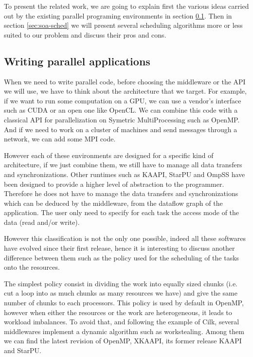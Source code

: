 \documentclass[10pt, conference, compsocconf]{IEEEtran}
\begin{document}
To present the related work, we are going to explain first the various ideas
carried out by the existing parallel programing environments in section
\ref{sec:soa-par-run}.  Then in section \ref{sec:soa-sched} we will
present several scheduling algorithms more or less suited to our problem and
discuss their pros and cons.

\subsection{Writing parallel applications} \label{sec:soa-par-run}

When we need to write parallel code, before choosing the middleware or the API
we will use, we have to think about the architecture that we target. For
example, if we want to run some computation on a GPU, we can use a vendor's
interface such as CUDA\cite{nvidia2010c} or an open one like
OpenCL\cite{stone2010opencl}. We can combine this code with a classical API
for parallelization on Symetric MultiProcessing such as
OpenMP\cite{dagum1998openmp}. And if we need to work on a cluster of machines
and send messages through a network, we can add some MPI\cite{lusk2009mpi}
code.

However each of these environments are designed for a specific kind of
architecture, if we just combine them, we still have to manage all data
transfers and synchronizations. Other runtimes such as
KAAPI\cite{gautier2007kaapi}, StarPU\cite{augonnet2011starpu} and
OmpSS\cite{bueno2011productive} have been designed to provide a higher level
of abstraction to the programmer. Therefore he does not have to manage the
data transfers and synchronizations which can be deduced by the middleware,
from the dataflow graph of the application. The user only need to specify for
each task the access mode of the data (read and/or write).

However this classification is not the only one possible, indeed all these
softwares have evolved since their first release, hence it is interesting to
discuss another difference between them such as the policy used for the
scheduling of the tasks onto the resources.

The simplest policy consist in dividing the work into equally sized chunks
(i.e. cut a loop into as much chunks as many resources we have) and give the
same number of chunks to each processors. This policy is used by default in
OpenMP, however when either the resources or the work are heterogeneous, it 
leads to workload imbalances. To avoid that, and following the example
of Cilk\cite{frigo1998implementation}, several middlewares implement a dynamic
algorithm such as workstealing\cite{blumofe1995cilk}. Among them we can find
the latest revision of OpenMP\cite{bueno2011productive},
XKAAPI\cite{gautierxkaapi}, its former release KAAPI\cite{gautier2007kaapi}
and StarPU\cite{augonnet2011starpu}.
\end{document}
